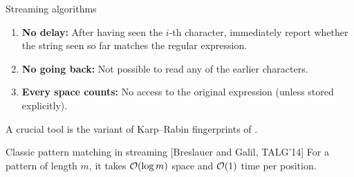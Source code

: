 \begin{frame}{Streaming algorithms}
\smallskip
\pause
\begin{enumerate}
\item \textbf{No delay:} After having seen the $i$-th character, immediately report whether the string seen so far matches the regular expression.
\pause
\item \textbf{No going back:} Not possible to read any of the earlier characters.
\pause
\item \textbf{Every space counts:} No access to the original expression (unless stored explicitly).
\end{enumerate}
\pause
\begin{center}
    \small
    A crucial  tool is the variant of Karp--Rabin fingerprints of .
\end{center}\pause
\begin{mylemblock}{Classic pattern matching in streaming [Breslauer and Galil, TALG'14]}
    For a pattern of length $m$, it takes $\mathcal{O}(\log m)$ space and $\mathcal{O}(1)$ time per position.
\end{mylemblock}

\end{frame}

